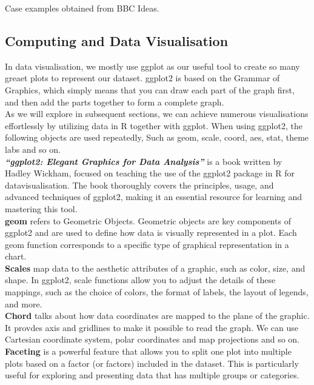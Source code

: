 \documentclass{article}\usepackage[]{graphicx}\usepackage[]{xcolor}
\begin{document}
\noindent
Case examples obtained from BBC Ideas\cite{bbcdatavis}.

\subsection{Computing and Data Visualisation}

In data visualisation, we mostly use ggplot as our useful tool to create so many greaet plots to represent our dataset. ggplot2 is based on the Grammar of Graphics, which simply means that you can draw each part of the graph first, and then add the parts together to form a complete graph.\\

\noindent
As we will explore in subsequent sections, we can achieve numerous visualisations effortlessly by utilizing data in R together with ggplot.
When using ggplot2, the following objects are used repeatedly, Such as geom, scale, coord, aes, stat, theme labs and so on.\\

\noindent
\textbf{\textit{``ggplot2: Elegant Graphics for Data Analysis''}} is a book written by Hadley Wickham, focused on teaching the use of the ggplot2 package in R for datavisualisation. The book thoroughly covers the principles, usage, and advanced techniques of ggplot2, making it an essential resource for learning and mastering this tool.\\

\noindent
\textbf{geom} refers to Geometric Objects. Geometric objects are key components of ggplot2 and are used to define how data is visually represented in a plot. Each geom function corresponds to a specific type of graphical representation in a chart.\\

\noindent
\textbf{Scales} map data to the aesthetic attributes of a graphic, such as color, size, and shape. In ggplot2, scale functions allow you to adjust the details of these mappings, such as the choice of colors, the format of labels, the layout of legends, and more.\\

\noindent
\textbf{Chord} talks about how data coordinates are mapped to the plane of the graphic. It provdes axis and gridlines to make it possible to read the graph. We can use Cartesian coordinate system, polar coordinates and map projections and so on.\\

\noindent
\textbf{Faceting} is a powerful feature that allows you to split one plot into multiple plots based on a factor (or factors) included in the dataset. This is particularly useful for exploring and presenting data that has multiple groups or categories.\\
\end{document}
